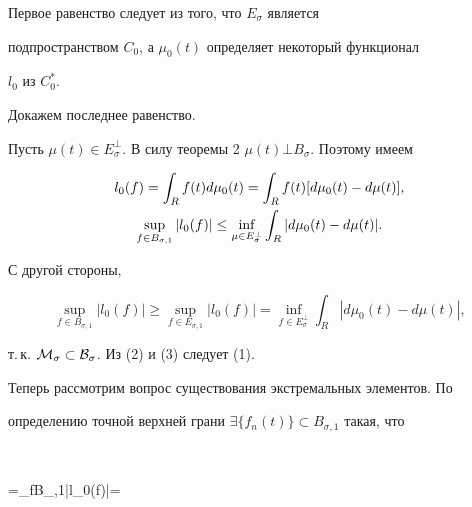\begin{pf} 


Первое равенство следует из того, что $E_\sigma$ является 


подпространством $C_0$, а $\mu_0(t)$ определяет некоторый функционал 


$l_0$ из $C^*_0$. 


Докажем последнее равенство. 


 


Пусть $\mu(t)\in E^\bot_\sigma$. В силу теоремы 2\; $\mu(t)\bot 


B_\sigma$. Поэтому имеем 


\begin{gather} 


l_0(f)=\int_R f(t)d\mu_0(t)=\int_R f(t) 


[d\mu_0(t)-d\mu(t)], \notag \\ 


% 


\sup_{f\in B_{\sigma,1}}|l_0(f)|\le 


\inf_{\mu\in E^\bot_\sigma}\int_R 


|d\mu_0(t)-d\mu(t)|. 


\end{gather} 


 


С другой стороны, 


\begin{equation} 


\sup_{f\in B_{\sigma,1}}|l_0(f)|\ge 


\sup_{f\in E_{\sigma,1}}|l_0(f)|=\inf_{f\in E^\bot_{\sigma}} 


\int_R|d\mu_0(t)-d\mu(t)|, 


\end{equation} 


т.\,к. $\cal M_\sigma\subset B_\sigma$. Из (2) и (3) следует (1). 


\end{pf} 


 


Теперь рассмотрим вопрос существования экстремальных элементов. По 


определению точной верхней грани $\exists\{f_n(t)\}\subset 


B_{\sigma,1}$ такая, что 


$$ 


\lambda=\sup_{f\in B_{\sigma,1}}|l_0(f)|= 


